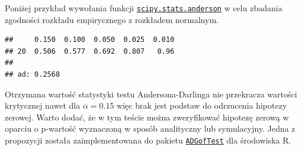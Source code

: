 \documentclass[polish,]{book}
\newenvironment{Shaded}{\begin{snugshade}}{\end{snugshade}}
\newcommand{\BuiltInTok}[1]{#1}
\newcommand{\CharTok}[1]{\textcolor[rgb]{0.31,0.60,0.02}{#1}}
\newcommand{\DecValTok}[1]{\textcolor[rgb]{0.00,0.00,0.81}{#1}}
\newcommand{\FloatTok}[1]{\textcolor[rgb]{0.00,0.00,0.81}{#1}}
\newcommand{\ImportTok}[1]{#1}
\newcommand{\NormalTok}[1]{#1}
\newcommand{\OperatorTok}[1]{\textcolor[rgb]{0.81,0.36,0.00}{\textbf{#1}}}
\newcommand{\SpecialCharTok}[1]{\textcolor[rgb]{0.00,0.00,0.00}{#1}}
\newcommand{\StringTok}[1]{\textcolor[rgb]{0.31,0.60,0.02}{#1}}
\begin{document}
Poniżej przykład wywołania funkcji \href{https://docs.scipy.org/doc/scipy/reference/generated/scipy.stats.anderson.html\#scipy.stats.anderson}{\texttt{scipy.stats.anderson}} w celu zbadania zgodności rozkładu empirycznego z rozkładem normalnym.

\begin{Shaded}
\end{Shaded}

\begin{verbatim}
##     0.150  0.100  0.050  0.025  0.010
## 20  0.506  0.577  0.692  0.807   0.96
## 
## ad: 0.2568
\end{verbatim}

Otrzymana wartość statystyki testu Andersona-Darlinga nie przekracza wartości krytycznej nawet dla \(\alpha=0.15\) więc brak jest podstaw do odrzucenia hipotezy zerowej. Warto dodać, że w tym teście można zweryfikować hipotezę zerową w oparciu o p-wartość wyznaczoną w sposób analityczny \citep{adgof} lub symulacyjny. Jedna z propozycji \citep{ad2004} została zaimplementowana do pakietu \href{https://rdrr.io/rforge/ADGofTest/}{\texttt{ADGofTest}} dla środowiska R.
\end{document}
